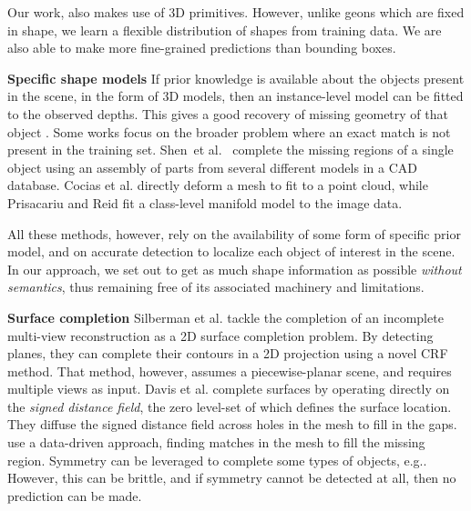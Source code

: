 \documentclass[10pt,twocolumn,letterpaper]{article}
\makeatletter
\renewcommand*{\eg}{e.g.\@\xspace}
\newcommand*{\ea}{et al.\@\xspace}
\newcommand{\note}[1]{\textcolor{blue}{NOTE: #1}}
\renewcommand{\paragraph}{\vspace{2pt}\noindent\textbf}
\makeatother
\begin{document}
Our work, also makes use of 3D primitives.
However, unlike geons which are fixed in shape, we learn a flexible distribution of shapes from training data.
We are also able to make more fine-grained predictions than bounding boxes.


\paragraph{Specific shape models}\newline
If prior knowledge is available about the objects present in the scene, in the form of 3D models, then an instance-level model can be fitted to the observed depths.
This gives a good recovery of missing geometry of that object \cite{hinterstoisser-accv-2012, drost-3dimpvt-2012,brachmann2014learning}.
Some works focus on the broader problem where an exact match is not present in the training set.
Shen~\ea~\cite{shen-tog-2012} complete the missing regions of a single object using an assembly of parts from several different models in a CAD database.
Cocias \ea \cite{cocias-cgvcv-2013} directly deform a mesh to fit to a point cloud, while Prisacariu and Reid \cite{prisacariu-iccv-2011} fit a class-level manifold model to the image data.

All these methods, however, rely on the availability of some form of specific prior model, and on accurate detection to localize each object of interest in the scene.
In our approach, we set out to get as much shape information as possible \emph{without semantics}, thus remaining free of its associated machinery and limitations.


\paragraph{Surface completion}\newline
Silberman \ea \cite{silberman-eccv-2014} tackle the completion of an incomplete multi-view reconstruction as a 2D surface completion problem.
By detecting planes, they can complete their contours in a 2D projection using a novel CRF method.
That method, however, assumes a piecewise-planar scene, and requires multiple views as input.
Davis \ea \cite{davis-3dpvt-2002} complete surfaces by operating directly on the \emph{signed distance field}, the zero level-set of which defines the surface location. They diffuse the signed distance field across holes in the mesh to fill in the gaps.
\cite{harary-tog-2013} use a data-driven approach, finding matches in the mesh to fill the missing region.
Symmetry can be leveraged to complete some types of objects, \eg \cite{law-cviu-2010, thrun-iccv-2005, kroemer-humanoids-2012}.
However, this can be brittle, and if symmetry cannot be detected at all, then no prediction can be made.
\end{document}
